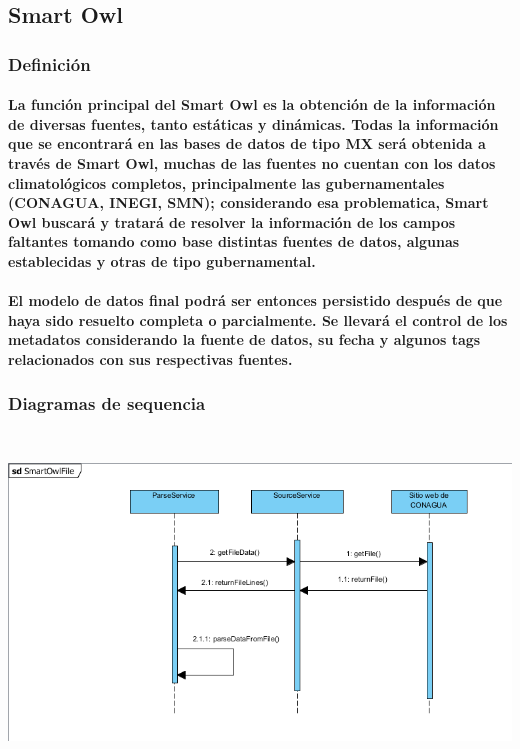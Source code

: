   \subsection{Smart Owl}
    \subsubsection{Definición}
      \paragraph{La función principal del Smart Owl es la obtención de la información de diversas fuentes, tanto estáticas y dinámicas. Todas la información que se encontrará en las bases de datos de tipo MX será obtenida a través de Smart Owl, muchas de las fuentes no cuentan con los datos climatológicos completos, principalmente las gubernamentales (CONAGUA, INEGI, SMN); considerando esa problematica, Smart Owl buscará y tratará de resolver la información de los campos faltantes tomando como base distintas fuentes de datos, algunas establecidas y otras de tipo gubernamental.}
      \paragraph{El modelo de datos final podrá ser entonces persistido después de que haya sido resuelto completa o parcialmente. Se llevará el control de los metadatos considerando la fuente de datos, su fecha y algunos tags relacionados con sus respectivas fuentes.}
    \subsubsection{Diagramas de sequencia}
    \begin{center}
      \includegraphics[width=14cm,height=9cm]{./images/SmartOwlSequenceDiagram}
    \end{center}
    
